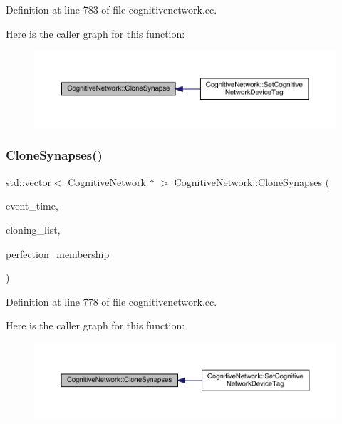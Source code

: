 Definition at line 783 of file cognitivenetwork.\+cc.

Here is the caller graph for this function\+:
\nopagebreak
\begin{figure}[H]
\begin{center}
\leavevmode
\includegraphics[width=350pt]{class_cognitive_network_a40f88d3ce9d386ee4db5c1e0ad84dad2_icgraph}
\end{center}
\end{figure}
\mbox{\label{class_cognitive_network_a82fe792704bcbf7df56b3023266f5f70}} 
\subsubsection{\texorpdfstring{Clone\+Synapses()}{CloneSynapses()}}
{\footnotesize\ttfamily std\+::vector$<$ \hyperlink{class_cognitive_network}{Cognitive\+Network} $\ast$ $>$ Cognitive\+Network\+::\+Clone\+Synapses (\begin{DoxyParamCaption}\item[{std\+::chrono\+::time\+\_\+point$<$ \hyperlink{universe_8h_a0ef8d951d1ca5ab3cfaf7ab4c7a6fd80}{Clock} $>$}]{event\+\_\+time,  }\item[{std\+::vector$<$ \hyperlink{class_cognitive_network}{Cognitive\+Network} $\ast$$>$}]{cloning\+\_\+list,  }\item[{double}]{perfection\+\_\+membership }\end{DoxyParamCaption})}



Definition at line 778 of file cognitivenetwork.\+cc.

Here is the caller graph for this function\+:
\nopagebreak
\begin{figure}[H]
\begin{center}
\leavevmode
\includegraphics[width=350pt]{class_cognitive_network_a82fe792704bcbf7df56b3023266f5f70_icgraph}
\end{center}
\end{figure}
\mbox{\label{class_cognitive_network_add96197c3dc51d94d06edb480fbc4a38}} 
